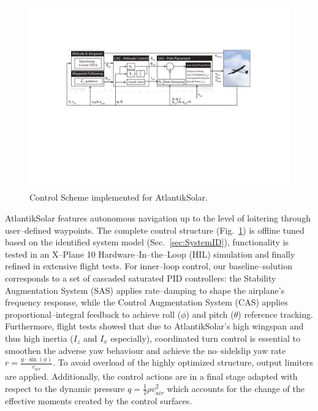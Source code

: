 \begin{figure}[tb]
    \centering
     \includegraphics[width=\linewidth]{images/11_ControlScheme/ControlScheme.pdf}
    \caption{Control Scheme implemented for AtlantikSolar.}
    \label{fig:ControlScheme}
\end{figure}

AtlantikSolar features autonomous navigation up to the level of loitering through user--defined waypoints. The complete control structure (Fig.~\ref{fig:ControlScheme}) is offline tuned based on the identified system model (Sec.~\ref{sec:SystemID}), functionality is tested in an X--Plane 10 Hardware--In--the--Loop (HIL) simulation and finally refined in extensive flight tests. For inner--loop control, our baseline--solution corresponds to a set of cascaded saturated PID controllers: the Stability Augmentation System (SAS) applies rate--damping to shape the airplane's frequency response, while the Control Augmentation System (CAS) applies proportional--integral feedback to achieve roll ($\phi$) and pitch ($\theta$) reference tracking. Furthermore, flight tests showed that due to AtlantikSolar's high wingspan and thus high inertia ($I_z$ and $I_x$ especially), coordinated turn control is essential to smoothen the adverse yaw behaviour and achieve the no--sidelslip yaw rate $r=\frac{g\cdot \sin(\phi)}{v_{air}}$. To avoid overload of the highly optimized structure, output limiters are applied. Additionally, the control actions are in a final stage adapted with respect to the dynamic pressure $q=\frac{1}{2}\rho v^{2}_{air}$ which accounts for the change of the effective moments created by the control surfaces. 

